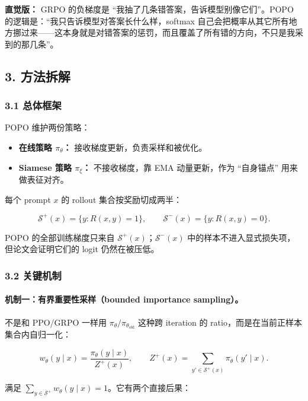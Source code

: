 \begin{intubox}
\textbf{直觉版：} GRPO 的负梯度是 ``我抽了几条错答案，告诉模型别像它们''。POPO 的逻辑是：``我只告诉模型对答案长什么样，softmax 自己会把概率从其它所有地方挪过来——这本身就是对错答案的惩罚，而且覆盖了所有错的方向，不只是我采到的那几条''。
\end{intubox}

\subsection{3. 方法拆解}

\subsubsection{3.1 总体框架}

POPO 维护两份策略：

\begin{itemize}[leftmargin=1.5em]
  \item \textbf{在线策略 $\pi_\theta$：} 接收梯度更新，负责采样和被优化。
  \item \textbf{Siamese 策略 $\pi_\xi$：} 不接收梯度，靠 EMA 动量更新，作为 ``自身锚点'' 用来做表征对齐。
\end{itemize}

每个 prompt $x$ 的 rollout 集合按奖励切成两半：

\[
\mathcal{S}^{+}(x)=\{y:R(x,y)=1\},
\qquad
\mathcal{S}^{-}(x)=\{y:R(x,y)=0\}.
\]

POPO 的全部训练梯度只来自 $\mathcal{S}^{+}(x)$；$\mathcal{S}^{-}(x)$ 中的样本不进入显式损失项，但论文会证明它们的 logit 仍然在被压低。

\subsubsection{3.2 关键机制}

\paragraph{机制一：有界重要性采样（bounded importance sampling）。}
不是和 PPO/GRPO 一样用 $\pi_\theta/\pi_{\theta_{\text{old}}}$ 这种跨 iteration 的 ratio，而是在当前正样本集合内自归一化：

\[
w_\theta(y\mid x)=\frac{\pi_\theta(y\mid x)}{Z^{+}(x)},
\qquad
Z^{+}(x)=\sum_{y'\in\mathcal{S}^{+}(x)}\pi_\theta(y'\mid x).
\]

满足 $\sum_{y\in\mathcal{S}^{+}}w_\theta(y\mid x)=1$。它有两个直接后果：

